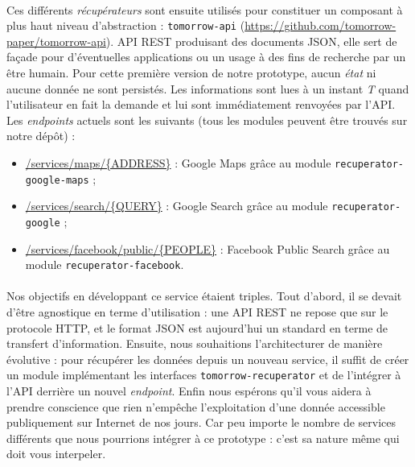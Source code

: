 \paragraph{} Ces différents \emph{récupérateurs} sont ensuite utilisés pour constituer un composant à plus haut niveau
d'abstraction : \lstinline{tomorrow-api} (\url{https://github.com/tomorrow-paper/tomorrow-api}). API REST produisant des
documents JSON, elle sert de façade pour d'éventuelles applications ou un usage à des fins de recherche par un être humain. 
Pour cette première version de notre prototype, aucun \emph{état} ni aucune donnée ne sont persistés. Les informations 
sont lues à un instant \emph{T} quand l'utilisateur en fait la demande et lui sont immédiatement renvoyées par l'API.
Les \emph{endpoints} actuels sont les suivants (tous les modules peuvent être trouvés sur notre dépôt) :

\begin{itemize}
    \item \url{/services/maps/{ADDRESS}} : Google Maps grâce au module \lstinline{recuperator-google-maps} ;
    \item \url{/services/search/{QUERY}} : Google Search grâce au module \lstinline{recuperator-google} ;
    \item \url{/services/facebook/public/{PEOPLE}} : Facebook Public Search grâce au module \lstinline{recuperator-facebook}.
\end{itemize}

\paragraph{} Nos objectifs en développant ce service étaient triples. Tout d'abord, il se devait d'être agnostique en terme
d'utilisation : une API REST ne repose que sur le protocole HTTP, et le format JSON est aujourd'hui un standard en terme
de transfert d'information. Ensuite, nous souhaitions l'architecturer de manière évolutive : pour récupérer les données
depuis un nouveau service, il suffit de créer un module implémentant les interfaces \lstinline{tomorrow-recuperator} et
de l'intégrer à l'API derrière un nouvel \emph{endpoint}. Enfin nous espérons qu'il vous aidera à prendre conscience que
rien n'empêche l'exploitation d'une donnée accessible publiquement sur Internet de nos jours. Car peu importe le nombre
de services différents que nous pourrions intégrer à ce prototype : c'est sa nature même qui doit vous interpeler.